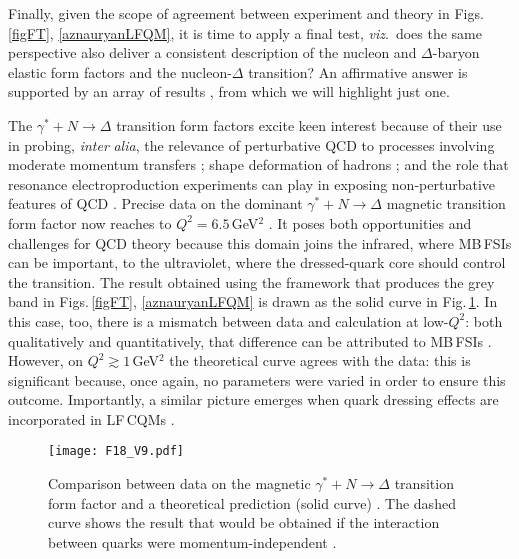 Finally, given the scope of agreement between experiment and theory in Figs.\,\ref{figFT}, \ref{aznauryanLFQM}, it is time to apply a final test, \emph{viz}.\ does the same perspective also deliver a consistent description of the nucleon and $\Delta$-baryon elastic form factors and the nucleon-$\Delta$ transition?  An affirmative answer is supported by an array of results \cite{Segovia:2014aza, Roberts:2015dea, Segovia:2016zyc}, from which we will highlight just one.

The $\gamma^\ast+N\to\Delta$ transition form factors excite keen interest because of their use in probing, \emph{inter} \emph{alia}, the relevance of perturbative QCD to processes involving moderate momentum transfers \cite{Carlson:1985mm, Pascalutsa:2006up, Aznauryan:2011qj}; shape deformation of hadrons \cite{Alexandrou:2012da}; and the role that resonance electroproduction experiments can play in exposing non-perturbative features of QCD \cite{Aznauryan:2012baS}.  Precise data on the dominant $\gamma^\ast+N\to\Delta$ magnetic transition form factor now reaches to $Q^2 = 6.5\,$GeV$^2$ \cite{Aznauryan:2009mx, Villano:2009sn}.  It poses both opportunities and challenges for QCD theory because this domain joins the infrared, where MB\,FSIs can be important, to the ultraviolet, where the dressed-quark core should control the transition.  The result obtained using the framework that produces the grey band in Figs.\,\ref{figFT}, \ref{aznauryanLFQM} is drawn as the solid curve in Fig.\,\ref{figNDelta}.  In this case, too, there is a mismatch between data and calculation at low-$Q^2$: both qualitatively and quantitatively, that difference can be attributed to MB\,FSIs \cite{Sato:2000jf, Burkert:2004sk, JuliaDiaz:2006xt, Pascalutsa:2006up, Crede:2013sze}.  However, on $Q^2\gtrsim 1\,$GeV$^2$ the theoretical curve agrees with the data: this is significant because, once again, no parameters were varied in order to ensure this outcome.  Importantly, a similar picture emerges when quark dressing effects are incorporated in LF\,CQMs  \cite{Aznauryan:2016wwm}.

\begin{figure}[t]
\centerline{\texttt{[image: F18\_V9.pdf]}}
\caption{\label{figNDelta}
%
Comparison between data \cite{Aznauryan:2009mx} on the magnetic $\gamma^\ast+N\to\Delta$ transition form factor and a theoretical prediction (solid curve) \cite{Segovia:2014aza, Segovia:2016zyc}.  The dashed curve shows the result that would be obtained if the interaction between quarks were momentum-independent \cite{Segovia:2013rca}.}
\end{figure}


